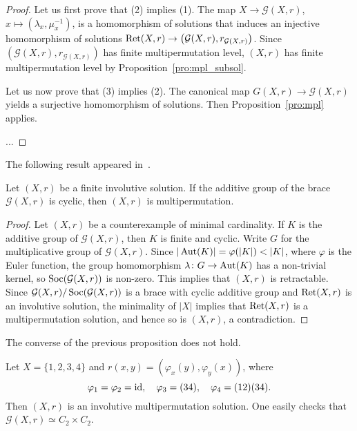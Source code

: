 \begin{proof}
    Let us first prove that (2) implies (1). 
    The map $X\to\mathcal{G}(X,r)$, $x\mapsto(\lambda_x,\mu_x^{-1})$, is a homomorphism of solutions that induces
    an injective homomorphism of solutions $\operatorname{Ret}(X,r)\to\left(\mathcal{G}(X,r),r_{\mathcal{G}(X,r)}\right)$. 
    Since $\left(\mathcal{G}(X,r),r_{\mathcal{G}(X,r)}\right)$ has finite multipermutation level,
    $(X,r)$ has finite multipermutation level by Proposition~\ref{pro:mpl_subsol}.
    
    Let us now prove that (3) implies (2). The canonical map $G(X,r)\to\mathcal{G}(X,r)$ yields a surjective
    homomorphism of solutions. Then Proposition~\ref{pro:mpl} applies. 

    ...
\end{proof}

The following result appeared in~\cite{MR1722951}.

\begin{proposition}
Let $(X,r)$ be a finite involutive solution. If the additive group 
of the brace $\mathcal{G}(X,r)$ is cyclic, then $(X,r)$ 
is multipermutation.
\end{proposition}

\begin{proof}
    Let $(X,r)$ be a counterexample of minimal cardinality. If $K$ is the additive 
    group of $\mathcal{G}(X,r)$, then $K$ is finite and cyclic. 
    Write $G$ for the multiplicative group of $\mathcal{G}(X,r)$. 
    Since $|\Aut(K)|=\varphi(|K|)<|K|$, where $\varphi$ is the Euler function, 
    the group homomorphism $\lambda\colon G\to\operatorname{Aut}(K)$ 
    has a non-trivial kernel, so $\operatorname{Soc}(\mathcal{G}(X,r))$ is non-zero.  
    This implies that $(X,r)$ is retractable. 
    Since $\mathcal{G}(X,r)/\operatorname{Soc}(\mathcal{G}(X,r))$ is a brace with cyclic 
    additive group and $\operatorname{Ret}(X,r)$ is an involutive solution, the 
    minimality of $|X|$ implies that 
    $\operatorname{Ret}(X,r)$ is a multipermutation solution, and hence so is $(X,r)$, 
    a contradiction. 
\end{proof}

The converse of the previous proposition does not hold. 

\begin{example}
	Let $X=\{1,2,3,4\}$ and $r(x,y)=(\varphi_x(y),\varphi_y(x))$, where
	\[
		\varphi_1=\varphi_2=\operatorname{id},\quad
		\varphi_3=(34),\quad
		\varphi_4=(12)(34).
 	\]
	Then $(X,r)$ is an involutive multipermutation solution. One easily checks
	that $\mathcal{G}(X,r)\simeq C_2\times C_2$.
\end{example}

